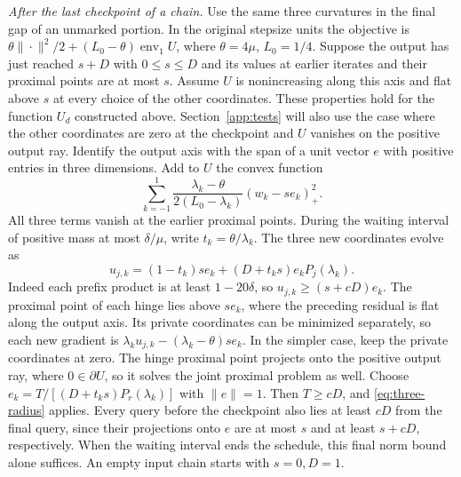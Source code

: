 \documentclass[11pt]{article}
\theoremstyle{definition}
\begin{document}
\emph{After the last checkpoint of a chain.} Use the same three curvatures in the final gap of an unmarked portion.
In the original stepsize units the objective is \(\theta\|\cdot\|^2/2+
(L_0-\theta)\operatorname{env}_1 U\), where \(\theta=4\mu\),
\(L_0=1/4\). Suppose the output has just reached \(s+D\) with \(0\le s\le D\)
and its values at earlier iterates and their proximal points are at most \(s\).
Assume \(U\) is nonincreasing along this axis
and flat above \(s\) at every choice of the other coordinates.
These properties hold for the function \(U_d\) constructed above.
Section~\ref{app:tests} will also use the case where the other coordinates
are zero at the checkpoint and \(U\) vanishes on the positive output ray.
Identify the output axis with the span of a unit vector \(e\) with positive
entries in three dimensions. Add to \(U\) the convex function
\[
 \sum_{k=-1}^1 \frac{\lambda_k-\theta}{2(L_0-\lambda_k)}
                     (w_k-se_k)_+^2 .
\]
All three terms vanish at the earlier proximal points. During the waiting
interval of positive mass at most \(\delta/\mu\), write
\(t_k=\theta/\lambda_k\). The three new coordinates evolve as
\[
 u_{j,k}=(1-t_k)s e_k+(D+t_ks)e_k P_j(\lambda_k).
\]
Indeed each prefix product is at least \(1-20\delta\), so
\(u_{j,k}\ge(s+cD)e_k\). The proximal point of each hinge lies above
\(se_k\), where the preceding residual is flat along the output axis. Its private coordinates can be minimized separately,
so each new gradient is \(\lambda_k u_{j,k}-(\lambda_k-\theta)se_k\).
In the simpler case, keep the private coordinates at zero. The
hinge proximal point projects onto the positive output ray, where
\(0\in\partial U\), so it solves the joint proximal problem as well.
Choose \(e_k=T/[(D+t_ks)P_r(\lambda_k)]\) with \(\|e\|=1\).
Then \(T\ge cD\), and \eqref{eq:three-radius} applies. Every query
before the checkpoint also lies at least \(cD\) from the final query,
since their projections onto \(e\) are at most \(s\) and at least \(s+cD\), respectively.
When the waiting interval ends the schedule, this final norm bound
alone suffices. An empty input chain starts with \(s=0,D=1\).
\end{document}
